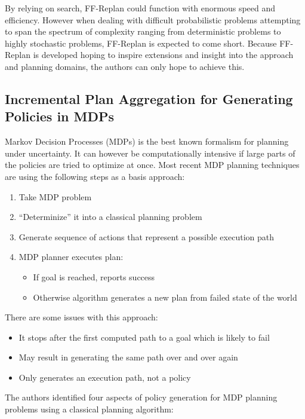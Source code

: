 \documentclass[runningheads,a4paper]{llncs}
\begin{document}
By relying on search, FF-Replan could function with enormous speed and efficiency. However when dealing with difficult probabilistic problems attempting to span the spectrum of complexity ranging from deterministic problems to highly stochastic problems, FF-Replan is expected to come short. Because FF-Replan is developed hoping to inspire extensions and insight into the approach and planning domains, the authors can only hope to achieve this.

\subsection{Incremental Plan Aggregation for Generating Policies in MDPs}

Markov Decision Processes (MDPs) is the best known formalism for planning under
uncertainty. It can however be computationally intensive if large parts of the
policies are tried to optimize at once. Most recent MDP planning techniques are
using the following steps as a basis approach:

\begin{enumerate}
	\item Take MDP problem
	\item ``Determinize''  it into a classical planning problem
	\item Generate sequence of actions that represent a possible execution
		path
	\item MDP planner executes plan:
		\begin{itemize}
			\item If goal is reached, reports success
			\item Otherwise algorithm generates a new plan from failed state of
				the world
		\end{itemize}
\end{enumerate}

There are some issues with this approach:

\begin{itemize}
	\item It stops after the first computed path to a goal which is likely to fail
	\item May result in generating the same path over and over again
	\item Only generates an execution path, not a policy
\end{itemize}

The authors identified four aspects of policy generation for MDP planning
problems using a classical planning algorithm:
\end{document}
